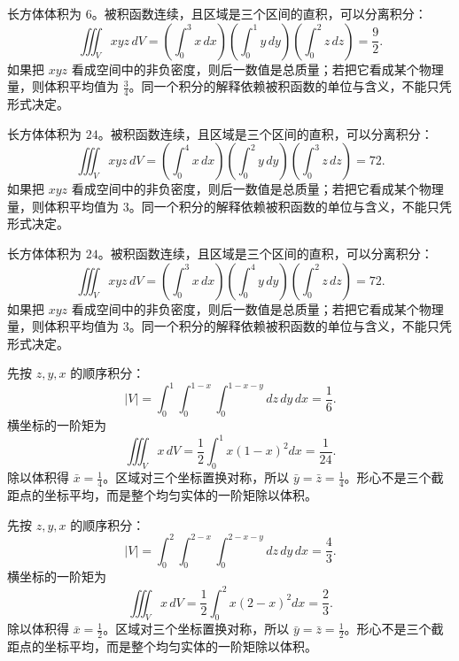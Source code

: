 \documentclass[UTF8,12pt,a4paper,fontset=fandol]{ctexart}
\begin{document}
\begin{solve}\label{ans:c38q4}
长方体体积为 $6$。被积函数连续，且区域是三个区间的直积，可以分离积分：
\[
\iiint_Vxyz\,dV=\left(\int_0^{3}x\,dx\right)\left(\int_0^{1}y\,dy\right)\left(\int_0^{2}z\,dz\right)=\frac{9}{2}.
\]
如果把 $xyz$ 看成空间中的非负密度，则后一数值是总质量；若把它看成某个物理量，则体积平均值为 $\frac{3}{4}$。同一个积分的解释依赖被积函数的单位与含义，不能只凭形式决定。
\end{solve}

\begin{solve}\label{ans:c38q5}
长方体体积为 $24$。被积函数连续，且区域是三个区间的直积，可以分离积分：
\[
\iiint_Vxyz\,dV=\left(\int_0^{4}x\,dx\right)\left(\int_0^{2}y\,dy\right)\left(\int_0^{3}z\,dz\right)=72.
\]
如果把 $xyz$ 看成空间中的非负密度，则后一数值是总质量；若把它看成某个物理量，则体积平均值为 $3$。同一个积分的解释依赖被积函数的单位与含义，不能只凭形式决定。
\end{solve}

\begin{solve}\label{ans:c38q6}
长方体体积为 $24$。被积函数连续，且区域是三个区间的直积，可以分离积分：
\[
\iiint_Vxyz\,dV=\left(\int_0^{3}x\,dx\right)\left(\int_0^{4}y\,dy\right)\left(\int_0^{2}z\,dz\right)=72.
\]
如果把 $xyz$ 看成空间中的非负密度，则后一数值是总质量；若把它看成某个物理量，则体积平均值为 $3$。同一个积分的解释依赖被积函数的单位与含义，不能只凭形式决定。
\end{solve}

\begin{solve}\label{ans:c38q7}
先按 $z,y,x$ 的顺序积分：
\[
|V|=\int_0^{1}\int_0^{1-x}\int_0^{1-x-y}dz\,dy\,dx=\frac{1}{6}.
\]
横坐标的一阶矩为
\[
\iiint_Vx\,dV=\frac12\int_0^{1}x(1-x)^2dx=\frac{1}{24}.
\]
除以体积得 $\bar x=\frac{1}{4}$。区域对三个坐标置换对称，所以 $\bar y=\bar z=\frac{1}{4}$。形心不是三个截距点的坐标平均，而是整个均匀实体的一阶矩除以体积。
\end{solve}

\begin{solve}\label{ans:c38q8}
先按 $z,y,x$ 的顺序积分：
\[
|V|=\int_0^{2}\int_0^{2-x}\int_0^{2-x-y}dz\,dy\,dx=\frac{4}{3}.
\]
横坐标的一阶矩为
\[
\iiint_Vx\,dV=\frac12\int_0^{2}x(2-x)^2dx=\frac{2}{3}.
\]
除以体积得 $\bar x=\frac{1}{2}$。区域对三个坐标置换对称，所以 $\bar y=\bar z=\frac{1}{2}$。形心不是三个截距点的坐标平均，而是整个均匀实体的一阶矩除以体积。
\end{solve}
\end{document}
